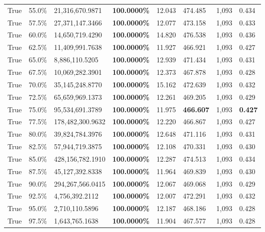 \begin{table}[H]
\begin{tabular}{lllrllll}
\cline{1-8}
True & 55.0\% & 21,316,670.9871 & \bfseries \color{red} 100.0000\% & 12.043 & 474.485 & 1,093 & 0.434 \\
\cline{1-8}
True & 57.5\% & 27,371,147.3466 & \bfseries \color{red} 100.0000\% & 12.077 & 473.158 & 1,093 & 0.433 \\
\cline{1-8}
True & 60.0\% & 14,650,719.4290 & \bfseries \color{red} 100.0000\% & 14.820 & 476.538 & 1,093 & 0.436 \\
\cline{1-8}
True & 62.5\% & 11,409,991.7638 & \bfseries \color{red} 100.0000\% & 11.927 & 466.921 & 1,093 & 0.427 \\
\cline{1-8}
True & 65.0\% & 8,886,110.5205 & \bfseries \color{red} 100.0000\% & 12.939 & 471.434 & 1,093 & 0.431 \\
\cline{1-8}
True & 67.5\% & 10,069,282.3901 & \bfseries \color{red} 100.0000\% & 12.373 & 467.878 & 1,093 & 0.428 \\
\cline{1-8}
True & 70.0\% & 35,145,248.8770 & \bfseries \color{red} 100.0000\% & 15.162 & 472.639 & 1,093 & 0.432 \\
\cline{1-8}
True & 72.5\% & 65,659,969.1373 & \bfseries \color{red} 100.0000\% & 12.261 & 469.205 & 1,093 & 0.429 \\
\cline{1-8}
True & 75.0\% & 95,534,691.3789 & \bfseries \color{red} 100.0000\% & 11.975 & \bfseries \color{red} 466.607 & 1,093 & \bfseries \color{red} 0.427 \\
\cline{1-8}
True & 77.5\% & 178,482,300.9632 & \bfseries \color{red} 100.0000\% & 12.220 & 466.867 & 1,093 & 0.427 \\
\cline{1-8}
True & 80.0\% & 39,824,784.3976 & \bfseries \color{red} 100.0000\% & 12.648 & 471.116 & 1,093 & 0.431 \\
\cline{1-8}
True & 82.5\% & 57,944,719.3875 & \bfseries \color{red} 100.0000\% & 12.108 & 470.331 & 1,093 & 0.430 \\
\cline{1-8}
True & 85.0\% & 428,156,782.1910 & \bfseries \color{red} 100.0000\% & 12.287 & 474.513 & 1,093 & 0.434 \\
\cline{1-8}
True & 87.5\% & 45,127,392.8338 & \bfseries \color{red} 100.0000\% & 11.964 & 469.839 & 1,093 & 0.430 \\
\cline{1-8}
True & 90.0\% & 294,267,566.0415 & \bfseries \color{red} 100.0000\% & 12.067 & 469.068 & 1,093 & 0.429 \\
\cline{1-8}
True & 92.5\% & 4,756,392.2112 & \bfseries \color{red} 100.0000\% & 12.007 & 472.291 & 1,093 & 0.432 \\
\cline{1-8}
True & 95.0\% & 2,710,110.5896 & \bfseries \color{red} 100.0000\% & 12.187 & 468.186 & 1,093 & 0.428 \\
\cline{1-8}
True & 97.5\% & 1,643,765.1638 & \bfseries \color{red} 100.0000\% & 11.904 & 467.577 & 1,093 & 0.428 \\
\cline{1-8}
\bottomrule
\end{tabular}
\end{table}
